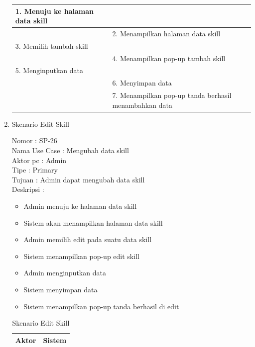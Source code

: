 \begin{enumerate}
\begin{table}
\begin{tabular}{ | l | p{65mm} |}
		1.	Menuju ke halaman data skill &  \\
		
		\hline
		
		&  2.	Menampilkan halaman data skill \\
		
		\hline
		
		3. Memilih tambah skill & \\
		
		\hline
		
		& 4.	Menampilkan pop-up tambah skill \\
		
		\hline
		
		5.	Menginputkan data  & \\
		\hline
		
		& 6.	Menyimpan data \\
		\hline
		
		& 7.	Menampilkan pop-up tanda berhasil menambahkan data \\
		\hline
		
	\end{tabular}
\end{table}

\item Skenario Edit Skill

Nomor \kern 3.6pc : SP-26 \\
Nama Use Case : Mengubah data skill \\
Aktor  pc : Admin \\
Tipe \kern 4.6pc : Primary \\
Tujuan \kern 3.6pc : Admin dapat mengubah data skill \\
Deskripsi \kern 2.5pc : 

\begin{itemize}
	\item Admin menuju ke halaman data skill
	\item Sistem akan menampilkan halaman data skill
	\item Admin memilih edit pada suatu data skill
	\item Sistem menampilkan pop-up edit skill
	\item Admin menginputkan data
	\item Sistem menyimpan data
	\item Sistem menampilkan pop-up tanda berhasil di edit
	
\end{itemize}

\begin{table}
	\caption{Skenario Edit Skill}
	\centering
	\begin{tabular}{ | l | p{60mm} |}
		\hline 
		\textbf{Aktor} & \textbf{Sistem} \\
		\hline
		

\end{tabular}
\end{table}
\end{enumerate}
